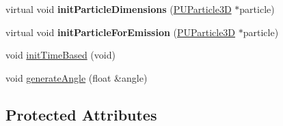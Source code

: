\begin{DoxyCompactItemize}
virtual void {\bfseries init\+Particle\+Dimensions} (\hyperlink{structPUParticle3D}{P\+U\+Particle3D} $\ast$particle)
\item 
\mbox{\label{classPUEmitter_ab53d75b79e506896a7b32bf17775bf39}} 
virtual void {\bfseries init\+Particle\+For\+Emission} (\hyperlink{structPUParticle3D}{P\+U\+Particle3D} $\ast$particle)
\item 
void \hyperlink{classPUEmitter_a20336349505af1844784d9a075013bd4}{init\+Time\+Based} (void)
\item 
void \hyperlink{classPUEmitter_a5035190c6af34e7a8a6484b45720b28c}{generate\+Angle} (float \&angle)
\end{DoxyCompactItemize}
\subsection*{Protected Attributes}
